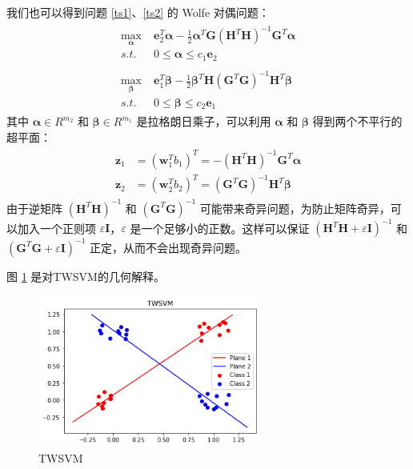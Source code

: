 我们也可以得到问题 \ref{ts1}、\ref{ts2} 的 Wolfe 对偶问题：
\begin{align}
\begin{split}
\max\limits_{\pmb{\alpha}} \; & \mathbf{e}_2^T \pmb{\alpha}-\frac{1}{2}\pmb{\alpha}^T\mathbf{G}(\mathbf{H}^T\mathbf{H})^{-1}\mathbf{G}^T\pmb{\alpha} \\
s.t. \; & 0 \leq \pmb{\alpha}\leq c_1 \mathbf{e}_2
\end{split}
\\
\begin{split}
\max\limits_{\pmb{\beta}} \; & \mathbf{e}_1^T \pmb{\beta}-\frac{1}{2}\pmb{\beta}^T\mathbf{H}(\mathbf{G}^T\mathbf{G})^{-1}\mathbf{H}^T\pmb{\beta} \\
s.t. \; & 0 \leq \pmb{\beta} \leq c_2\mathbf{e}_1
\end{split}
\end{align}
其中 $\mathbf{\alpha} \in R^{m_2}$ 和 $\mathbf{\beta}\in R^{m_1}$ 是拉格朗日乘子，可以利用 $\mathbf{\alpha}$ 和 $\mathbf{\beta}$ 得到两个不平行的超平面：
\begin{align}
\begin{split}
\mathbf{z}_1 &= (\mathbf{w}^T_1b_1)^T = -(\mathbf{H}^T\mathbf{H})^{-1} \mathbf{G}^
T\pmb{\alpha} \\
\mathbf{z}_2 &= (\mathbf{w}^T_2b_2)^T = (\mathbf{G}^T\mathbf{G})^{-1} \mathbf{H}^T\pmb{\beta}
\end{split}
\end{align}
由于逆矩阵 $(\mathbf{H}^T\mathbf{H})^{-1}$ 和 $(\mathbf{G}^T\mathbf{G})^{-1}$ 可能带来奇异问题，为防止矩阵奇异，可以加入一个正则项 $\varepsilon \mathbf{I}$，$\varepsilon$ 是一个足够小的正数。这样可以保证 $(\mathbf{H}^T\mathbf{H}+\varepsilon \mathbf{I})^{-1}$ 和 $(\mathbf{G}^T\mathbf{G}+\varepsilon \mathbf{I})^{-1}$ 正定，从而不会出现奇异问题。

图 \ref{twsvm1} 是对TWSVM的几何解释。
\begin{figure}[ht]
\centering
\includegraphics[height=5cm]{./img/TWSVM-img.png}
\caption{TWSVM}
\label{twsvm1}
\end{figure}
